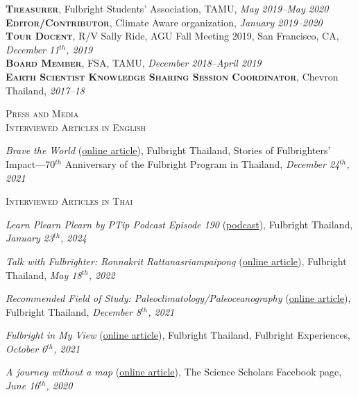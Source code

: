 \documentclass[10pt, letter]{article}
\newcommand{\margintext}[1]{\marginnote{\normalsize\textbf #1 |}}
\begin{document}
\bigskip
\textsc{\textbf{Treasurer}}, Fulbright Students’ Association, TAMU, \textit{May 2019–May 2020} \\
\textsc{\textbf{Editor/Contributor}}, Climate Aware organization, \textit{January 2019–2020} \\
\textsc{\textbf{Tour Docent}}, R/V Sally Ride, AGU Fall Meeting 2019, San Francisco, CA, \textit{December 11$^{th}$, 2019}\\
\textsc{\textbf{Board Member}}, FSA, TAMU, \textit{December 2018–April 2019}\\
\textsc{\textbf{Earth Scientist Knowledge Sharing Session Coordinator}}, Chevron Thailand, \textit{2017–18}


\bigskip
\margintext{Outreach}
\textsc{Press and Media}\\
\textsc{Interviewed Articles in English}
\begin{etaremune}
\item \textit{Brave the World} (\href{https://issuu.com/fulbrightthailand/docs/storeis_fo_fulbrighters_impact}{online article}), Fulbright Thailand, Stories of Fulbrighters’ Impact—70$^{th}$ Anniversary of the Fulbright Program in Thailand, \textit{December 24$^{th}$, 2021}
\end{etaremune}

\textsc{Interviewed Articles in Thai}
\begin{etaremune}
\item \textit{Learn Plearn Plearn by PTip Podcast Episode 190} (\href{https://open.spotify.com/episode/5iJYhIJBjMwboy3JaC0Rp3?si=7d5a29447a72444b}{podcast}), Fulbright Thailand, \textit{January 23$^{th}$, 2024}
\item \textit{Talk with Fulbrighter: Ronnakrit Rattanasriampaipong} (\href{https://www.fulbrightthai.org/fulbright-stories/khuykab-fulbrighter-rnkrsdi-ratnsrii-amaiphphngs}{online article}), Fulbright Thailand, \textit{May 18$^{th}$, 2022}
\item \textit{Recommended Field of Study: Paleoclimatology/Paleoceanography} (\href{https://www.fulbrightthai.org/knowledge-sharing/saakhaa-yaakaenanam-1-paleoclimatology-paleoceanography}{online article}), Fulbright Thailand, \textit{December 8$^{th}$, 2021}
\item \textit{Fulbright in My View} (\href{https://anyflip.com/afeb/buat/?fbclid=IwAR08dv9XF7UCimtM9SjwICdCSwSQfuTHNtPbbaepT4WZlTcNRXB9eNtUsi8}{online article}), Fulbright Thailand, Fulbright Experiences, \textit{October 6$^{th}$, 2021}
\item \textit{A journey without a map} (\href{https://www.facebook.com/ThaiScienceScholars/photos/a.114754726700839/170670231109288/?type=3}{online article}), The Science Scholars Facebook page, \textit{June 16$^{th}$, 2020}
\end{etaremune}
\end{document}

